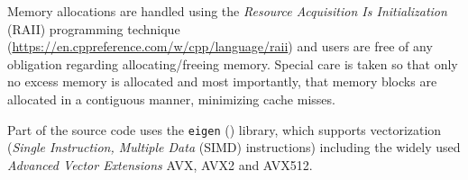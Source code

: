 Memory allocations are handled using the \emph{Resource Acquisition Is Initialization} (RAII) 
programming technique (\url{https://en.cppreference.com/w/cpp/language/raii}) and 
users are free of any obligation regarding allocating/freeing memory. Special care is 
taken so that only no excess memory is allocated and most importantly, that memory blocks 
are allocated in a contiguous manner, minimizing cache misses.

Part of the source code uses the \texttt{eigen} (\cite{eigenweb}) library, which 
supports vectorization (\emph{Single Instruction, Multiple Data} (SIMD) instructions) 
including the widely used \emph{Advanced Vector Extensions} AVX, AVX2 and AVX512.

